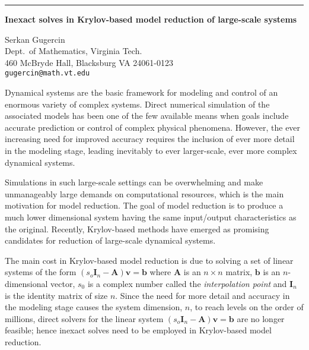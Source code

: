 \documentclass[twosided]{report}
\begin{document}
	\begin{center} \rule{6in}{1pt} \end{center}

\begin{center}
{\large			%
{\bf Inexact solves in Krylov-based model reduction of large-scale systems}}

	Serkan Gugercin \\
	Dept.~of Mathematics, Virginia Tech. \\
	460 McBryde Hall, Blacksburg VA 24061-0123 \\
	{\tt gugercin@math.vt.edu}
\end{center}
Dynamical systems are the basic framework for modeling and
control of an enormous variety of complex systems. Direct
numerical simulation of the associated models has been one
of the few available means when goals include accurate
prediction or control of complex physical phenomena.
However, the ever increasing need for improved accuracy
requires the inclusion of ever more detail in the modeling
stage, leading inevitably to ever larger-scale, ever more
complex dynamical systems.

Simulations in such
large-scale settings can be overwhelming and make
unmanageably large demands on computational resources, which
is the main motivation for model reduction. The goal of
model reduction is to produce a much lower dimensional
system having the same input/output characteristics as the
original. Recently, Krylov-based methods have emerged as
promising candidates for reduction of large-scale dynamical
systems.

The main cost in Krylov-based model reduction
is due to solving a set of linear systems of the form
$(s_o \mathbf{I}_n - \mathbf{A}) \mathbf{v} = \mathbf{b}$
where
$\mathbf{A}$ is an ${n \times n}$ matrix, $\mathbf{b}$ is an
$n$-dimensional vector, $s_0$ is a complex number called the
{\it interpolation point} and $\mathbf{I}_n$ is the identity
matrix of size $n$. Since the need for more detail and
accuracy in the modeling stage causes the system dimension,
$n$, to reach levels on the order of millions, direct
solvers for the linear system
$(s_o \mathbf{I}_n - \mathbf{A}) \mathbf{v} = \mathbf{b}$
are no longer feasible;
hence inexact solves need to be employed in Krylov-based
model reduction.
\end{document}
